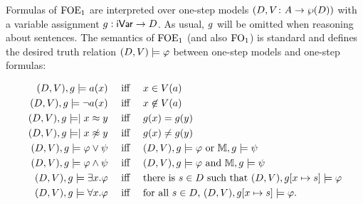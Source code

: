 
Formulas of $\mathrm{FOE}_1$ are interpreted over one-step models $(D,V \colon A \to \wp(D))$ with a variable assignment $g: \mathsf{iVar} \to D$. As usual, $g$ will be omitted when reasoning about sentences. The semantics of $\mathrm{FOE}_1$ (and also $\mathrm{FO}_1$) is standard and defines the desired truth relation $(D, V) \models \varphi$ between one-step models and one-step formulas:
%

\begin{align*}
(D, \val),\ass \models a(x) & \quad\text{ iff }\quad  x \in \val(a) \\
(D, \val),\ass \models \lnot a(x) & \quad\text{ iff }\quad  x \not\in \val(a) \\
(D, \val),\ass \models \mid x \foeq y & \quad\text{ iff }\quad \ass(x) = \ass(y) \\
(D, \val),\ass \models \mid x \not\foeq y & \quad\text{ iff }\quad \ass(x) \neq \ass(y) \\
(D, \val),\ass \models \varphi\lor\psi & \quad\text{ iff }\quad  (D, \val),\ass \models \varphi \text{ or } \npmodel,\ass \models \psi \\
(D, \val),\ass \models \varphi\land\psi & \quad\text{ iff }\quad  (D, \val),\ass \models \varphi \text{ and } \npmodel,\ass \models \psi \\
(D, \val),\ass \models \exists x.\varphi & \quad\text{ iff }\quad  \text{there is $s \in D$ such that $(D, \val), \ass[x\mapsto s] \models \varphi$}\\
(D, \val),\ass \models \forall x.\varphi & \quad\text{ iff }\quad  \text{for all $s \in D$, } (D, \val), \ass[x\mapsto s] \models \varphi.
\end{align*}




